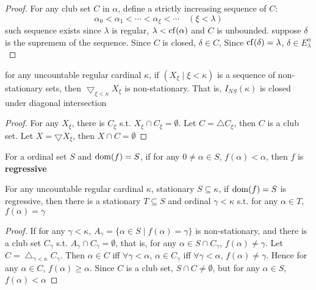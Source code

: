 \documentclass[11pt]{article}
\def \btu {\bigtriangleup}
\def \btd {\bigtriangledown}
\begin{document}
\begin{proof}
For any club set \(C\) in \(\alpha\), define a strictly increasing sequence of \(C\):
\begin{equation*}
\alpha_0<\alpha_1<\cdots<\alpha_\xi<\cdots\quad (\xi<\lambda)
\end{equation*}
such sequence exists since \(\lambda\) is regular, \(\lambda<\operatorname{cf}(\alpha)\) and \(C\) is unbounded. suppose \(\delta\) is the
supremem of the sequence. Since \(C\) is closed, \(\delta\in C\), Since \(\operatorname{cf}(\delta)=\lambda\), \(\delta\in E_\lambda^\alpha\)
\end{proof}

\begin{proposition}[]
for any uncountable regular cardinal \(\kappa\), if \((X_\xi\mid\xi<\kappa)\) is a sequence of non-stationary sets,
then \(\btd_{\xi<\kappa}X_\xi\) is non-stationary. That is, \(I_{NS}(\kappa)\) is closed under diagonal intersection
\end{proposition}

\begin{proof}
For any \(X_\xi\), there is \(C_\xi\) s.t. \(X_\xi\cap C_\xi=\emptyset\). Let \(C=\btu C_\xi\), then \(C\) is a club
set. Let \(X=\btd X_\xi\), then \(X\cap C=\emptyset\)
\end{proof}

\begin{definition}[]
For a ordinal set \(S\) and \(\operatorname{dom}(f)=S\), if for any \(0\neq\alpha\in S\), \(f(\alpha)<\alpha\), then \(f\) is \textbf{regressive}
\end{definition}

\begin{theorem}[Fodor]
For any uncountable regular cardinal \(\kappa\), stationary \(S\subseteq\kappa\), if \(\operatorname{dom}(f)=S\) is regressive, then
there is a stationary \(T\subseteq S\) and ordinal \(\gamma<\kappa\) s.t. for any \(\alpha\in T\), \(f(\alpha)=\gamma\)
\end{theorem}

\begin{proof}
If for any \(\gamma<\kappa\), \(A_\gamma=\{\alpha\in S\mid f(\alpha)=\gamma\}\) is non-stationary, and there is a club set \(C_\gamma\)
s.t. \(A_\gamma\cap C_\gamma=\emptyset\), that is, for any \(\alpha\in S\cap C_\gamma\), \(f(\alpha)\neq\gamma\). Let \(C=\btu_{\gamma<\kappa}C_\gamma\).
Then \(\alpha\in C\) iff \(\forall\gamma<\alpha\), \(\alpha\in C_\gamma\) iff \(\forall\gamma<\alpha\), \(f(\alpha)\neq\gamma\). Hence for
any \(\alpha\in C\), \(f(\alpha)\ge\alpha\). Since \(C\) is a club set, \(S\cap C\neq\emptyset\), but for any \(\alpha\in S\), \(f(\alpha)<\alpha\)
\end{proof}
\end{document}
